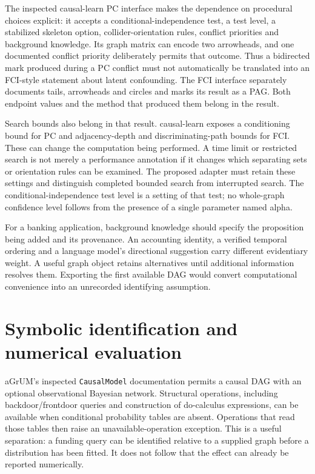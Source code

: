 The inspected causal-learn PC interface makes the dependence on procedural
choices explicit: it accepts a conditional-independence test, a test level,
a stabilized skeleton option, collider-orientation rules, conflict priorities
and background knowledge. Its graph matrix can encode two arrowheads, and
one documented conflict priority deliberately permits that outcome. Thus a
bidirected mark produced during a PC conflict must not automatically be
translated into an FCI-style statement about latent confounding. The FCI
interface separately documents tails, arrowheads and circles and marks its
result as a PAG. Both endpoint values and the method that produced them
belong in the result.\cite{v12_sw_causallearn}

Search bounds also belong in that result. causal-learn exposes a conditioning
bound for PC and adjacency-depth and discriminating-path bounds for FCI. These
can change the computation being performed. A time limit or restricted search
is not merely a performance annotation if it changes which separating sets or
orientation rules can be examined. The proposed adapter must retain these
settings and distinguish completed bounded search from interrupted search.
The conditional-independence test level is a setting of that test; no whole-graph
confidence level follows from the presence of a single parameter named alpha.

For a banking application, background knowledge should specify the proposition
being added and its provenance. An accounting identity, a verified temporal
ordering and a language model's directional suggestion carry different
evidentiary weight. A useful graph object retains alternatives until additional
information resolves them. Exporting the first available DAG would convert
computational convenience into an unrecorded identifying assumption.





\section{Symbolic identification and numerical evaluation}

aGrUM's inspected \texttt{CausalModel} documentation permits a causal DAG with
an optional observational Bayesian network. Structural operations, including
backdoor/frontdoor queries and construction of do-calculus expressions, can
be available when conditional probability tables are absent. Operations that
read those tables then raise an unavailable-operation exception. This is a
useful separation: a funding query can be identified relative to a supplied
graph before a distribution has been fitted. It does not follow that the
effect can already be reported numerically.\cite{v12_sw_agrum}


